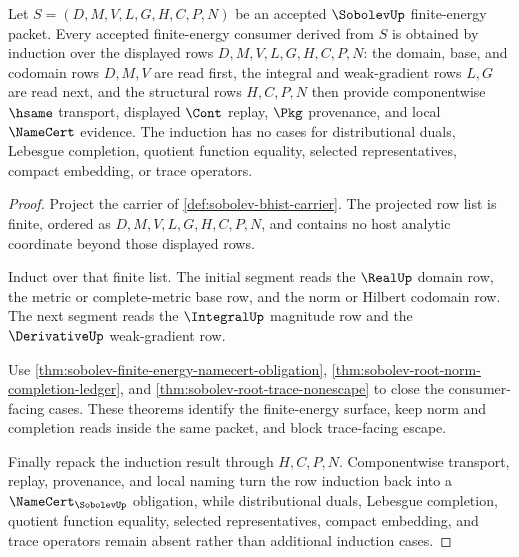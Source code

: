 \begin{theorem}
\label{thm:sobolev-finite-energy-induction-route}
Let $S=(D,M,V,L,G,H,C,P,N)$ be an accepted $\SobolevUp$ finite-energy packet. Every accepted finite-energy consumer derived from $S$ is obtained by induction over the displayed rows $D,M,V,L,G,H,C,P,N$: the domain, base, and codomain rows $D,M,V$ are read first, the integral and weak-gradient rows $L,G$ are read next, and the structural rows $H,C,P,N$ then provide componentwise $\hsame$ transport, displayed $\Cont$ replay, $\Pkg$ provenance, and local $\NameCert$ evidence. The induction has no cases for distributional duals, Lebesgue completion, quotient function equality, selected representatives, compact embedding, or trace operators.
\end{theorem}
\begin{proof}
Project the carrier of \autoref{def:sobolev-bhist-carrier}. The projected row list is finite, ordered as $D,M,V,L,G,H,C,P,N$, and contains no host analytic coordinate beyond those displayed rows.

Induct over that finite list. The initial segment reads the $\RealUp$ domain row, the metric or complete-metric base row, and the norm or Hilbert codomain row. The next segment reads the $\IntegralUp$ magnitude row and the $\DerivativeUp$ weak-gradient row.

Use \autoref{thm:sobolev-finite-energy-namecert-obligation}, \autoref{thm:sobolev-root-norm-completion-ledger}, and \autoref{thm:sobolev-root-trace-nonescape} to close the consumer-facing cases. These theorems identify the finite-energy surface, keep norm and completion reads inside the same packet, and block trace-facing escape.

Finally repack the induction result through $H,C,P,N$. Componentwise transport, replay, provenance, and local naming turn the row induction back into a $\NameCert_{\SobolevUp}$ obligation, while distributional duals, Lebesgue completion, quotient function equality, selected representatives, compact embedding, and trace operators remain absent rather than additional induction cases.
\end{proof}

